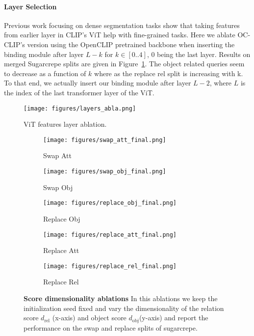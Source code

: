 \paragraph{Layer Selection} Previous work focusing on dense segmentation tasks\citep{xu2022groupvitsemanticsegmentationemerges} show that taking features from earlier layer in CLIP's ViT help with fine-grained tasks. Here we ablate OC-CLIP's version using the OpenCLIP pretrained backbone when inserting the binding module after layer $L-k$ for $k \in [0..4]$, 0 being the last layer. Results on merged Sugarcrepe splits are given in Figure~\ref{fig:layers}. The object related queries seem to decrease as a function of $k$ where as the replace rel split is increasing with k. To that end, we actually insert our binding module after layer $L-2$, where $L$ is the index of the last transformer layer of the ViT.
\begin{figure}
    \centering
    \texttt{[image: figures/layers\_abla.png]}
    \caption{ViT features layer ablation.}
    \label{fig:layers}
\end{figure}

\begin{figure}[ht]
\centering
    \begin{subfigure}[b]{0.19\textwidth}
        \centering    \texttt{[image: figures/swap\_att\_final.png]}
        \caption{Swap Att}
    \end{subfigure}%
    \hfill
    \begin{subfigure}[b]{0.19\textwidth}
        \centering    \texttt{[image: figures/swap\_obj\_final.png]}
        \caption{Swap Obj}
    \end{subfigure}%
    \hfill
    \begin{subfigure}[b]{0.19\textwidth}
        \centering    \texttt{[image: figures/replace\_obj\_final.png]}
        \caption{Replace Obj}
    \end{subfigure}%
    \hfill
    \begin{subfigure}[b]{0.19\textwidth}
        \centering    \texttt{[image: figures/replace\_att\_final.png]}
        \caption{Replace Att}
    \end{subfigure}%
    \hfill
    \begin{subfigure}[b]{0.19\textwidth}
        \centering    \texttt{[image: figures/replace\_rel\_final.png]}
        \caption{Replace Rel}
    \end{subfigure}%
  \caption{\textbf{Score dimensionality ablations} In this ablations we keep the initialization seed fixed and vary the dimensionality of the relation score $d_{\text{rel}}$ (x-axis) and object score $d_{\text{obj}}$(y-axis) and report the performance on the swap and replace splits of sugarcrepe.}
  \label{fig:abla_dim}
\end{figure}


